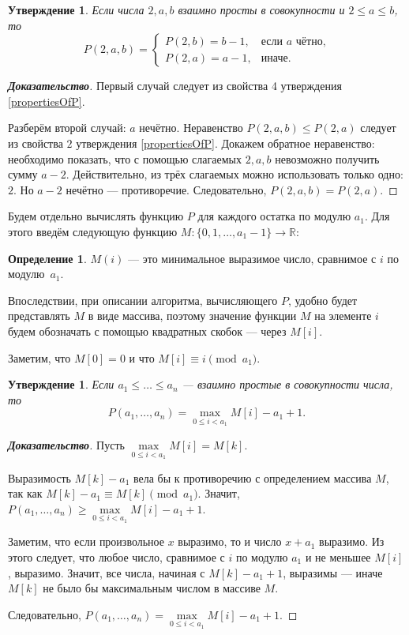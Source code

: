 \documentclass[12pt]{article}
\newtheorem{proposition}[theorem]{Утверждение}
\theoremstyle{definition}
\newtheorem{definition}[theorem]{Определение}
\begin{document}
\begin{proposition}
Если числа $2, a, b$ взаимно просты в совокупности и $2 \le a \le b$, то \begin{equation*}
P(2, a, b) = \begin{cases}
P(2, b) = b - 1, &\text{если $a$ чётно,} \\
P(2, a) = a - 1,&\text{иначе.}
\end{cases}
\end{equation*}

\end{proposition}
\begin{proof}[\textbf{Доказательство}]
Первый случай следует из свойства 4 утверждения \ref{propertiesOfP}.

Разберём второй случай: $a$ нечётно. Неравенство $P(2, a, b) \le P(2, a)$ следует из свойства $2$ утверждения \ref{propertiesOfP}. Докажем обратное неравенство: необходимо показать, что с помощью слагаемых $2, a, b$ невозможно получить сумму $a - 2$. Действительно, из трёх слагаемых можно использовать только одно: $2$. Но $a - 2$ нечётно --- противоречие. Следовательно, $P(2, a, b) = P(2, a)$.
\end{proof}

Будем отдельно вычислять функцию $P$ для каждого остатка по модулю $a_1$. Для этого введём следующую функцию $M : \{ 0, 1, \dots, a_1 - 1\} \rightarrow \mathbb{R}$:

\begin{definition}
$M(i)$ --- это минимальное выразимое число, сравнимое с $i$ по модулю~$a_1$.
\end{definition}

Впоследствии, при описании алгоритма, вычисляющего $P$, удобно будет представлять $M$ в виде массива, поэтому значение функции $M$ на элементе $i$ будем обозначать с помощью квадратных скобок --- через $M[i]$.

Заметим, что $M[0] = 0$ и что $M[i] \equiv i \pmod {a_1}$.

\begin{proposition}
\label{algorithm:lemma1}
Если $a_1 \le \dots \le a_n$ --- взаимно простые в совокупности числа, то \begin{equation*}
P(a_1, \dots, a_n) = \max\limits_{0 \le i < a_1} M[i] - a_1 + 1.
\end{equation*}
\end{proposition}
\begin{proof}[\textbf{Доказательство}]
Пусть $\max\limits_{0 \le i < a_1} M[i] = M[k]$.

Выразимость $M[k] - a_1$ вела бы к противоречию с определением массива $M$, так как $M[k] - a_1 \equiv M[k] \pmod {a_1}$. Значит, $P(a_1, \dots, a_n) \ge \max\limits_{0 \le i < a_1} M[i] - a_1 + 1$.

Заметим, что если произвольное $x$ выразимо, то и число $x + a_1$ выразимо. Из этого следует, что любое число, сравнимое с $i$ по модулю $a_1$ и не меньшее $M[i]$, выразимо. Значит, все числа, начиная с $M[k] - a_1 + 1$, выразимы --- иначе $M[k]$ не было бы максимальным числом в массиве $M$.

Следовательно, $P(a_1, \dots, a_n) = \max\limits_{0 \le i < a_1} M[i] - a_1 + 1$.
\end{proof}
\end{document}
